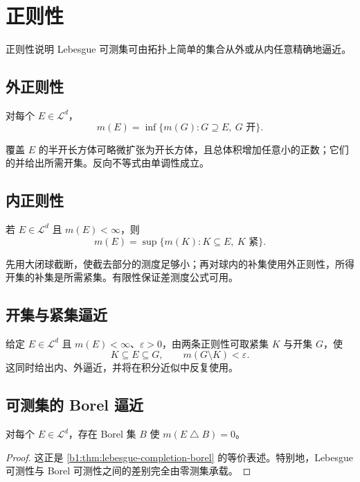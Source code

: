 \section{正则性}
\label{b1:sec:0303}

正则性说明 Lebesgue 可测集可由拓扑上简单的集合从外或从内任意精确地逼近。

\subsection{外正则性}
\label{b1:subsec:030301}

\begin{theorem}\label{b1:thm:outer-regular}
对每个 \(E\in\mathcal L^d\)，
\[
m(E)=\inf\{m(G):G\supseteq E,\ G\text{ 开}\}.
\]
\end{theorem}
\begin{proofsketch}
覆盖 \(E\) 的半开长方体可略微扩张为开长方体，且总体积增加任意小的正数；它们的并给出所需开集。反向不等式由单调性成立。
\end{proofsketch}

\subsection{内正则性}
\label{b1:subsec:030302}

\begin{theorem}\label{b1:thm:inner-regular}
若 \(E\in\mathcal L^d\) 且 \(m(E)<\infty\)，则
\[
m(E)=\sup\{m(K):K\subseteq E,\ K\text{ 紧}\}.
\]
\end{theorem}
\begin{proofsketch}
先用大闭球截断，使截去部分的测度足够小；再对球内的补集使用外正则性，所得开集的补集是所需紧集。有限性保证差测度公式可用。
\end{proofsketch}

\subsection{开集与紧集逼近}
\label{b1:subsec:030303}

给定 \(E\in\mathcal L^d\) 且 \(m(E)<\infty\)、\(\varepsilon>0\)，由两条正则性可取紧集 \(K\) 与开集 \(G\)，使
\[
K\subseteq E\subseteq G,
\qquad
m(G\setminus K)<\varepsilon.
\]
这同时给出内、外逼近，并将在积分近似中反复使用。

\subsection{可测集的 Borel 逼近}
\label{b1:subsec:030304}

\begin{theorem}\label{b1:thm:borel-approximation}
对每个 \(E\in\mathcal L^d\)，存在 Borel 集 \(B\) 使 \(m(E\mathbin{\triangle}B)=0\)。
\end{theorem}
\begin{proof}
这正是 \cref{b1:thm:lebesgue-completion-borel} 的等价表述。特别地，Lebesgue 可测性与 Borel 可测性之间的差别完全由零测集承载。
\end{proof}
